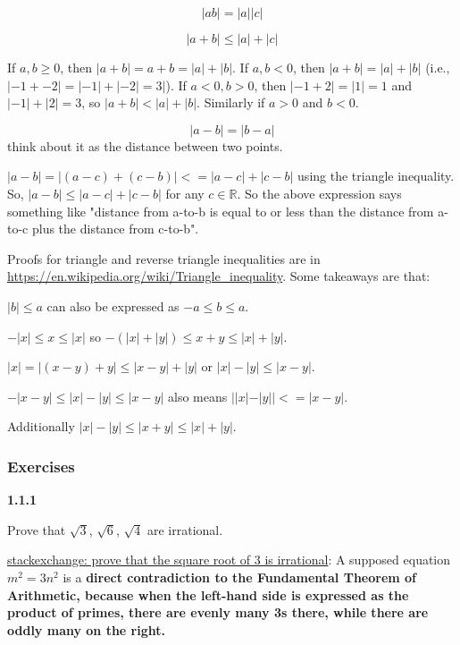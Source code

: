 \begin{equation}
    |ab| = |a| |c|
\end{equation}

\begin{equation}
    |a+b| \leq |a| + |c|
\end{equation}

If $a,b \geq 0$, then $|a+b| = a+b = |a| + |b|$.
If $a,b < 0$, then $|a+b| = |a| + |b|$ (i.e., $|-1 + -2| = |-1| + |-2| = 3|$).
If $a<0, b>0$, then $|-1+2| = |1|=1$ and $|-1| + |2| = 3$, so $|a+b| < |a| + |b|$. Similarly if $a>0$ and $b<0$.

\begin{equation}
    |a-b| = |b-a|
\end{equation}
think about it as the distance between two points.

$|a-b| = |(a-c) + (c-b)| <= |a-c| + |c-b|$ using the triangle inequality. 
So, $|a-b| \leq |a-c| + |c-b|$ for any $c \in \mathbb{R}$.
So the above expression says something like "distance from a-to-b is equal to or less than the distance from a-to-c
plus the distance from c-to-b".

Proofs for triangle and reverse triangle inequalities are in \url{https://en.wikipedia.org/wiki/Triangle_inequality}.
Some takeaways are that:

$|b| \leq a$ can also be expressed as $-a \leq b \leq a$.

$-|x| \leq x \leq |x|$ so $-(|x|+|y|) \leq x+y \leq |x|+|y|$.

$|x| = |(x-y) + y| \leq |x-y| + |y|$ or $|x| - |y| \leq |x-y|$.

$-|x-y| \leq |x| - |y| \leq |x-y|$ also means $||x|-|y|| <= |x-y|$.

Additionally $|x| - |y| \leq |x+y| \leq |x| + |y|$.






\subsubsection{Exercises}

\textbf{1.1.1}

Prove that $\sqrt{3}$, $\sqrt{6}$, $\sqrt{4}$ are irrational.

\href{https://math.stackexchange.com/questions/930486/prove-that-the-square-root-of-3-is-irrational}{stackexchange: prove that the square root of 3 is irrational}:
A supposed equation $m^2 = 3n^2$ is a \textbf{direct contradiction to the Fundamental Theorem of Arithmetic,
because when the left-hand side is expressed as the product of primes, there are evenly many 3s there,
while there are oddly many on the right.}
\\~\\




